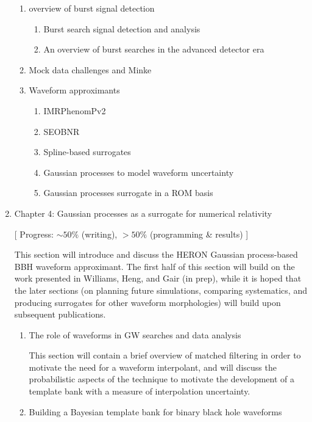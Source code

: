 \documentclass[openleft]{kentigern}
\theoremstyle{definition}
\begin{document}
\begin{enumerate}
\begin{enumerate}
  \item overview of burst signal detection
    \begin{enumerate}
    \item Burst search signal detection and analysis
    \item An overview of burst searches in the advanced detector era
    \end{enumerate}
    
  \item Mock data challenges and Minke
  \item Waveform approximants
    \begin{enumerate}
    \item IMRPhenomPv2   
    \item SEOBNR
    \item Spline-based surrogates
    \item Gaussian processes to model waveform uncertainty
    \item Gaussian processes surrogate in a ROM basis
    \end{enumerate}
  \end{enumerate}
\item Chapter 4: Gaussian processes as a surrogate for numerical relativity
  
  [ Progress: $\sim 50\%$ (writing), $>50\%$  (programming \& results) ]

  This
    section will introduce and discuss the HERON Gaussian
    process-based BBH waveform approximant. The first half of this
    section will build on the work presented in Williams, Heng, and
    Gair (in prep), while it is hoped that the later sections (on
    planning future simulations, comparing systematics, and producing
    surrogates for other waveform morphologies) will build upon
    subsequent publications.

    \begin{enumerate}
    
    \item The role of waveforms in GW searches and data analysis
      
   This section will contain a brief overview of matched filtering in
   order to motivate the need for a waveform interpolant, and will
   discuss the probabilistic aspects of the technique to motivate the
   development of a template bank with a measure of interpolation
   uncertainty.   
 \item Building a Bayesian template bank for binary black hole waveforms
   

\end{enumerate}
\end{enumerate}
\end{document}
